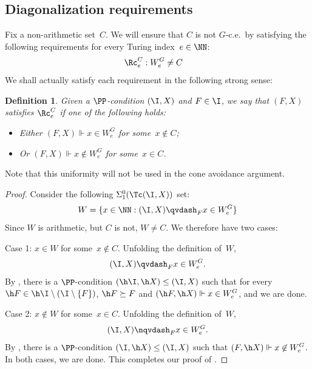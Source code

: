 \documentclass{article}
\numberwithin{theorem}{section}
\newtheorem{lemma}[theorem]{Lemma}
\newtheorem{definition}[theorem]{Definition}
\begin{document}
\subsection{Diagonalization requirements}

Fix a non-arithmetic set~$C$. We will ensure that $C$ is not $G$-c.e.\ by satisfying the following requirements for every Turing index~$e \in \NN$:
\begin{align*}
\Rc^C_e & : W^G_e \neq C
\end{align*}
We shall actually satisfy each requirement in the following strong sense:

\begin{definition}
Given a $\PP$-condition $(\I, X)$ and $F \in \I$, we say that \emph{$(F, X)$ satisfies $\Rc^C_e$} if one of the following holds:
\begin{itemize}
    \item[(1)] Either $(F, X) \Vdash x \in W^G_e$ for some~$x \not \in C$;
    \item[(2)] Or $(F, X) \Vdash x \not \in W^G_e$ for some~$x \in C$.
\end{itemize}
\end{definition}

Note that this uniformity will not be used in the cone avoidance argument.

\begin{proof}
Consider the following $\Sigma^0_1(\Tc(\I, X))$ set:
\begin{align*}
W = \{ x \in \NN : (\I, X) \qvdash_F x \in W_e^G \}
\end{align*}
Since $W$ is arithmetic, but $C$ is not, $W \neq C$.
We therefore have two cases:
\smallskip

\noindent
Case 1: $x \in W$ for some~$x \not \in C$. Unfolding the definition of~$W$, 
$$(\I, X) \qvdash_F x \in W_e^G.$$
By , there is a $\PP$-condition $(\h \I, \h X) \leq (\I, X)$ such that for every~$\h F \in \h \I \setminus (\I \setminus \{F\})$, $\h F \succeq F$ and $(\h F, \h X) \Vdash x \in W_e^G$, and we are done.
\smallskip

\noindent
Case 2: $x \not \in W$ for some~$x \in C$. Unfolding the definition of~$W$, 
$$(\I, X) \nqvdash_F x \in W_e^G.$$
By , there is a $\PP$-condition $(\I, \h X) \leq (\I, X)$ such that $(F, \h X) \Vdash x \not \in W^G_e$.
In both cases, we are done. This completes our proof of .
\end{proof}
\end{document}
